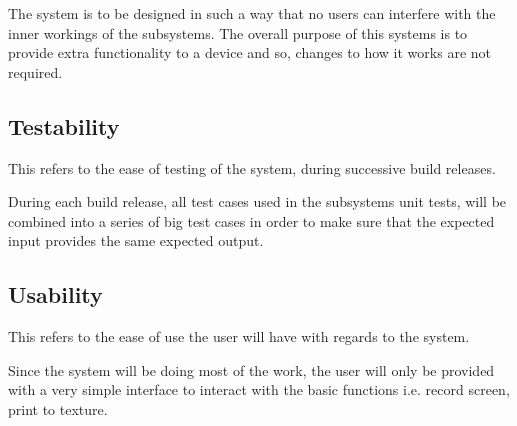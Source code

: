The system is to be designed in such a way that no users can interfere with the inner workings of the subsystems. The overall purpose of this systems is to provide extra functionality to a device and so, changes to how it works are not required.
\fi
\subsection{Testability}
This refers to the ease of testing of the system, during successive build releases.

During each build release, all test cases used in the subsystems unit tests, will be combined into a series of big test cases in order to make sure that the expected input provides the same expected output.

\subsection{Usability}
This refers to the ease of use the user will have with regards to the system.

Since the system will be doing most of the work, the user will only be provided with a very simple interface to interact with the basic functions i.e. record screen, print to texture.
